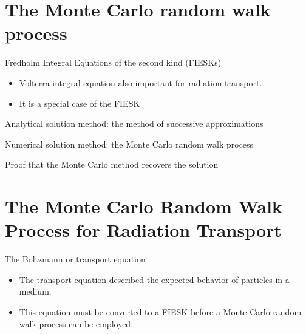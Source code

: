 \documentclass{beamer}
\begin{document}
\section{The Monte Carlo random walk process}
\begin{frame}{Fredholm Integral Equations of the second kind (FIESKs)}

  \begin{itemize}
    \item Volterra integral equation also important for radiation transport.
    \item It is a special case of the FIESK
   \end{itemize}

\end{frame}

\begin{frame}{Analytical solution method: the method of successive approximations}

\end{frame}

\begin{frame}{Numerical solution method: the Monte Carlo random walk process}

\end{frame}

\begin{frame}{Proof that the Monte Carlo method recovers the solution}

\end{frame}

\section{The Monte Carlo Random Walk Process for Radiation Transport}
\begin{frame}{The Boltzmann or transport equation}

  \begin{itemize}
    \item The transport equation described the expected behavior of particles
      in a medium.
    \item This equation must be converted to a FIESK before a Monte Carlo
      random walk process can be employed.
  \end{itemize}

\end{frame}
\end{document}
